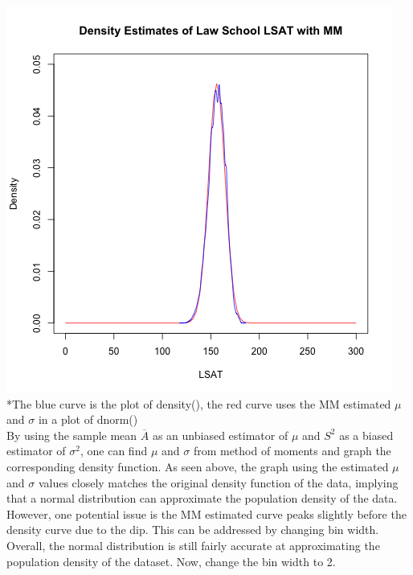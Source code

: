 \documentclass[12pt, letterpaper]{article}
\begin{document}
\includegraphics[scale=0.85]{Lawschool_LSAT_Density_mm} \\
\footnotesize
\**The blue curve is the plot of density(), the red curve uses the MM estimated $\mu$ and $\sigma$ in a plot of dnorm() \\
\normalsize
By using the sample mean $\overline{A}$ as an unbiased estimator of $\mu$ and $S^2$ as a biased estimator of $\sigma^2$, one can find $\mu$ and $\sigma$ from method of moments and graph the corresponding density function. As seen above, the graph using the estimated $\mu$ and $\sigma$ values closely matches the original density function of the data, implying that a normal distribution can approximate the population density of the data. However, one potential issue is the MM estimated curve peaks slightly before the density curve due to the dip. This can be addressed by changing bin width. Overall, the normal distribution is still fairly accurate at approximating the population density of the dataset. Now, change the bin width to 2.   \\
\end{document}
